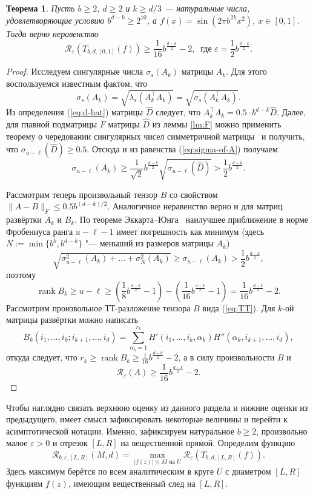 \documentclass[3p]{cmmp}%
\DeclareMathOperator{\rank}{rank}
\newtheorem{theorem}{Теорема}
\numberwithin{equation}{section}
\begin{document}
\begin{theorem}\label{thm:lower}
	Пусть $b \ge 2$, $d \ge 2$ и $k \ge d/3$ --- натуральные числа, удовлетворяющие условию  $b^{d-k} \geq 2^{10}$, а
	$f(x) = \sin (2\pi b^{2k}x^2)$, $x \in[0,1]$.
	Тогда верно неравенство
	\[
	\mathcal{R}_\varepsilon\left(T_{b,d,[0,1]}(f)\right) \geq \frac{1}{16}b^{\frac{d-k}{2}} - 2, ~\text{ где } \varepsilon = \frac{1}{2}b^{\frac{d-k}{2}}.
	\]
\end{theorem}
\begin{proof}
	Исследуем сингулярные числа $\sigma_s(A_k)$ матрицы $A_k$.
	Для этого воспользуемся известным фактом, что 
	\begin{equation}\label{eq:sigma-of-A}
	\sigma_s(A_k) = \sqrt{\lambda_s(A_k^{\top}A_k)} = \sqrt{\sigma_s(A_k^{\top} A_k)}.
	\end{equation}
	Из определения (\ref{eq:d-hat}) матрицы $\widehat{D}$ следует, что 
	$
	A_k^{\top}A_k = 0.5\cdot b^{d-k}\widehat{D}. 		
	$
	Далее, для главной подматрицы $F$ матрицы $\widehat{D}$ из леммы \ref{lm:F} можно применить теорему о чередовании сингулярных чисел симметричной матрицы~\cite{MNA} и получить, что
	$\sigma_{u-\ell}(\widehat{D}) \geq 0.5$.
	Отсюда и из равенства (\ref{eq:sigma-of-A}) получаем
	\[
	\sigma_{u-\ell}(A_k) \geq \frac{1}{\sqrt{2}} b^{\frac{d-k}{2}} \sqrt{\sigma_{u-\ell}(\widehat{D})} > \frac{1}{2}b^{\frac{d-k}{2}}.
	\]
	
	Рассмотрим теперь произвольный тензор $B$ со свойством $\|A - B\|_F \leq 0.5 b^{(d-k)/2}$.
	Аналогичное неравенство верно и для матриц развёртки $A_k$ и $B_k$.
	По теореме Эккарта--Юнга~\cite{Eckart1936} наилучшее приближение в норме Фробениуса ранга $u-\ell-1$ имеет погрешность как минимум (здесь $N := \min\{b^k, b^{d-k}\}$ "--- меньший из размеров матрицы $A_k$)
	\[
	\sqrt{\sigma_{u-\ell}^2(A_k) + \dots + \sigma_{N}^2(A_k)} \geq \sigma_{u-\ell}(A_k) > \frac{1}{2}b^{\frac{d-k}{2}},
	\]
	поэтому
	\[
	\rank B_k \geq u - \ell \geq \left(\frac{1}{8}b^{\frac{d-k}{2}} - 1\right) - \left(\frac{1}{16}b^{\frac{d-k}{2}} - 1\right) = \frac{1}{16}b^{\frac{d-k}{2}} - 2.
	\]
	Рассмотрим произвольное ТТ-разложение тензора $B$ вида (\ref{eq:TT}).
	Для $k$-ой матрицы развёртки можно написать
	\[
	B_k(i_1, \dots, i_{k}; i_{k+1}, \dots, i_d) = \sum_{\alpha_k = 1}^{r_k} H'(i_1, \dots, i_k, \alpha_k) H''(\alpha_k, i_{k+1}, \dots, i_d),
	\]
	откуда следует, что $r_k \geq \rank B_k \geq \frac{1}{16}b^{\frac{d-k}{2}} - 2$, а в силу произвольности $B$ и
	\[
	\mathcal{R}_\varepsilon(A) \geq \frac{1}{16}b^{\frac{d-k}{2}} - 2.
	\]
\end{proof}
Чтобы наглядно связать верхнюю оценку из данного раздела и нижние оценки из предыдущего, имеет смысл зафиксировать некоторые величины и перейти к асимптотической нотации.
Именно, зафиксируем натуральное $b \geq 2$, произвольно малое $\varepsilon > 0$ и отрезок $[L, R]$ на вещественной прямой.
Определим функцию
\[
\mathcal{R}_{b, \varepsilon, [L,R]}(M, d) = \max_{|f(z)| \leq M \text{ на } U}\mathcal{R}_\varepsilon(T_{b,d,[L,R]}(f)).
\]
Здесь максимум берётся по всем аналитическим в круге $U$ с диаметром $[L,R]$ функциям $f(z)$, имеющим вещественный след на $[L,R]$.
\end{document}
